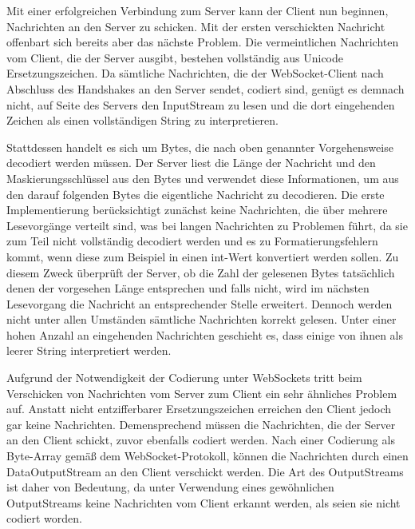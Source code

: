 \documentclass[12pt, onecolumn, notitlepage]{scrartcl}
\begin{document}
Mit einer erfolgreichen Verbindung zum Server kann der Client nun beginnen, Nachrichten an den Server zu schicken. Mit der ersten verschickten Nachricht offenbart sich bereits aber das nächste Problem. Die vermeintlichen Nachrichten vom Client, die der Server ausgibt, bestehen vollständig aus Unicode Ersetzungszeichen. Da sämtliche Nachrichten, die der WebSocket-Client nach Abschluss des Handshakes an den Server sendet, codiert sind, genügt es demnach nicht, auf Seite des Servers den InputStream zu lesen und die dort eingehenden Zeichen als einen vollständigen String zu interpretieren. \par

Stattdessen handelt es sich um Bytes, die nach oben genannter Vorgehensweise decodiert werden müssen. Der Server liest die Länge der Nachricht und den Maskierungsschlüssel aus den Bytes und verwendet diese Informationen, um aus den darauf folgenden Bytes die eigentliche Nachricht zu decodieren. Die erste Implementierung berücksichtigt zunächst keine Nachrichten, die über mehrere Lesevorgänge verteilt sind, was bei langen Nachrichten zu Problemen führt, da sie zum Teil nicht vollständig decodiert werden und es zu Formatierungsfehlern kommt, wenn diese zum Beispiel in einen int-Wert konvertiert werden sollen. Zu diesem Zweck überprüft der Server, ob die Zahl der gelesenen Bytes tatsächlich denen der vorgesehen Länge entsprechen und falls nicht, wird im nächsten Lesevorgang die Nachricht an entsprechender Stelle erweitert. Dennoch werden nicht unter allen Umständen sämtliche Nachrichten korrekt gelesen. Unter einer hohen Anzahl an eingehenden Nachrichten geschieht es, dass einige von ihnen als leerer String interpretiert werden. \par

Aufgrund der Notwendigkeit der Codierung unter WebSockets tritt beim Verschicken von Nachrichten vom Server zum Client ein sehr ähnliches Problem auf. Anstatt nicht entzifferbarer Ersetzungszeichen erreichen den Client jedoch gar keine Nachrichten. Demensprechend müssen die Nachrichten, die der Server an den Client schickt, zuvor ebenfalls codiert werden. Nach einer Codierung als Byte-Array gemäß dem WebSocket-Protokoll, können die Nachrichten durch einen DataOutputStream an den Client verschickt werden. Die Art des OutputStreams ist daher von Bedeutung, da unter Verwendung eines gewöhnlichen OutputStreams keine Nachrichten vom Client erkannt werden, als seien sie nicht codiert worden. \par
\end{document}
